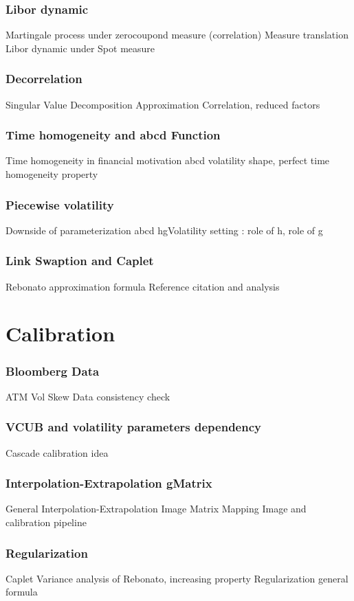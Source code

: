 \documentclass[8pt]{beamer}
\begin{document}
\begin{frame}
\frametitle{Libor dynamic}
Martingale process under zerocoupond measure (correlation)
Measure translation
Libor dynamic under Spot measure
\end{frame}

\begin{frame}
\frametitle{Decorrelation}
Singular Value Decomposition
Approximation Correlation, reduced factors
\end{frame}

\begin{frame}
\frametitle{Time homogeneity and abcd Function}
Time homogeneity in financial motivation
abcd volatility shape, perfect time homogeneity property
\end{frame}

\begin{frame}
\frametitle{Piecewise volatility}
Downside of parameterization abcd
hgVolatility setting : role of h, role of g 
\end{frame}

\begin{frame}
\frametitle{Link Swaption and Caplet}
Rebonato approximation formula
Reference citation and analysis
\end{frame}


\section{Calibration}
\begin{frame}
\frametitle{Bloomberg Data}
ATM Vol
Skew
Data consistency check
\end{frame}

\begin{frame}
\frametitle{VCUB and volatility parameters dependency}
Cascade calibration idea
\end{frame}

\begin{frame}
\frametitle{Interpolation-Extrapolation gMatrix}
General Interpolation-Extrapolation Image
Matrix Mapping Image and calibration pipeline 
\end{frame}


\begin{frame}
\frametitle{Regularization}
Caplet Variance analysis of Rebonato, increasing property
Regularization general formula
\end{frame}
\end{document}
